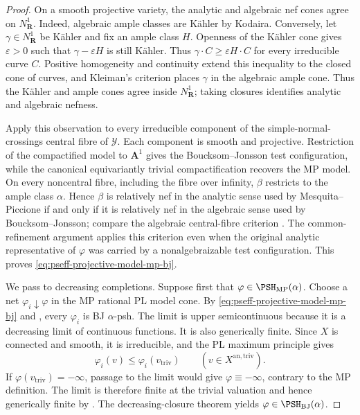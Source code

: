\begin{proof}
On a smooth projective variety, the analytic and algebraic nef cones agree
on \(N^1_{\mathbf R}\).  Indeed, algebraic ample classes are K\"ahler by
Kodaira.  Conversely, let \(\gamma\in N^1_{\mathbf R}\) be K\"ahler and
fix an ample class \(H\).  Openness of the K\"ahler cone gives
\(\varepsilon>0\) such that \(\gamma-\varepsilon H\) is still K\"ahler.
Thus \(\gamma\cdot C\geq\varepsilon H\cdot C\) for every irreducible
curve \(C\).  Positive homogeneity and continuity extend this inequality
to the closed cone of curves, and Kleiman's criterion places \(\gamma\)
in the algebraic ample cone.  Thus the K\"ahler and ample cones agree
inside \(N^1_{\mathbf R}\); taking closures identifies analytic and
algebraic nefness.

Apply this observation to every irreducible component of the
simple-normal-crossings central fibre of \(\mathcal Y\).  Each component
is smooth and projective.  Restriction of the compactified model to
\(\mathbf A^1\) gives the Boucksom--Jonsson test configuration, while the
canonical equivariantly trivial compactification recovers the MP model.
On every noncentral fibre, including the fibre over infinity,
\(\beta\) restricts to the ample class \(\alpha\).  Hence \(\beta\) is
relatively nef in the analytic sense used by Mesquita--Piccione if and
only if it is relatively nef in the algebraic sense used by
Boucksom--Jonsson; compare the algebraic central-fibre criterion
\cite[Lemma~3.1]{BJ22}.  The common-refinement argument applies this
criterion even when the original analytic representative of \(\varphi\)
was carried by a nonalgebraizable test configuration.  This proves
\eqref{eq:pseff-projective-model-mp-bj}.

We pass to decreasing completions.  Suppose first that
\(\varphi\in\PSH_{\mathrm{MP}}(\alpha)\).  Choose a net
\(\varphi_i\downarrow\varphi\) in the MP rational PL model cone.  By
\eqref{eq:pseff-projective-model-mp-bj} and
\cite[Lemma~4.3]{BJ22}, every \(\varphi_i\) is BJ
\(\alpha\)-psh.  The limit is upper semicontinuous because it is a
decreasing limit of continuous functions.  It is also generically finite.
Since \(X\) is connected and smooth, it is irreducible, and the PL maximum
principle \cite[Proposition~3.6(iv)]{BJ22} gives
\[
                  \varphi_i(v)\leq\varphi_i(v_{\mathrm{triv}})
                  \qquad(v\in X^{\mathrm{an,triv}}).
\]
If \(\varphi(v_{\mathrm{triv}})=-\infty\), passage to the limit would give
\(\varphi\equiv-\infty\), contrary to the MP definition.  The limit is
therefore finite at the trivial valuation and hence generically finite by
\cite[Lemma~1.4(ii)]{BJ22}.  The decreasing-closure theorem
\cite[Theorem~4.5]{BJ22} yields
\(\varphi\in\PSH_{\mathrm{BJ}}(\alpha)\).


\end{proof}
